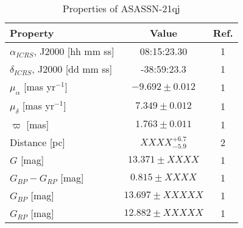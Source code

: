 \documentclass{aa}
\begin{document}
\begin{table}
    \centering
    \caption{ Properties of ASASSN-21qj}
    \begin{tabular}{@{}lcc@{}}
    \hline\hline
Property                               & Value                     & Ref.  \\
        \hline
         $\alpha_{ICRS}$, J2000 {[}hh mm ss{]}  & 08:15:23.30              & 1     \\
         $\delta_{ICRS}$, J2000 {[}dd mm ss{]}  & -38:59:23.3              & 1     \\
         $\mu_{\alpha}$ {[}mas yr$^{-1}${]}     & $-9.692\pm0.012$          & 1     \\
         $\mu_{\delta}$ {[}mas yr$^{-1}${]}     & $7.349\pm0.012$          & 1     \\
         $\varpi$ {[}mas{]}                     & $1.763\pm0.011$         & 1     \\
         Distance {[}pc{]}                      & $XXXX^{+6.7}_{-5.9}$     & 2     \\ 
        \hline
         $G$ {[}mag{]}                          & $13.371\pm XXXX$        & 1     \\
         $G_{BP}-G_{RP}$ {[}mag{]}              & $0.815\pm XXXX$        & 1     \\
         $G_{BP}$ {[}mag{]}                     & $13.697\pm XXXXX$        & 1     \\
         $G_{RP}$ {[}mag{]}                     & $12.882\pm XXXXX$        & 1     \\

\end{tabular}
\end{table}
\end{document}
